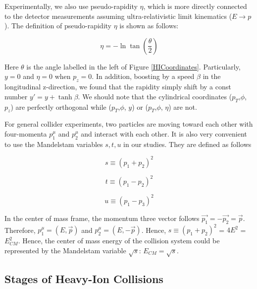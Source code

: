 Experimentally, we also use pseudo-rapidity $\eta$, which is more directly connected to the detector measurements assuming ultra-relativistic limit kinematics ($E \rightarrow p$). The definition of pseudo-rapidity $\eta$ is shown as follows:

\begin{equation}
\eta =  - \ln \tan(\frac{\theta}{2})
\end{equation}

Here $\theta$ is the angle labelled in the left of Figure \ref{HICoordinates}. Particularly, $y = 0$ and $\eta = 0$ when $p_z = 0$. In addition, boosting by a speed $\beta$ in the longitudinal z-direction, we found that the rapidity simply shift by a const number $y' = y + \tanh \beta$. We should note that the cylindrical coordinates ($p_T$,$\phi$, $p_z$) are perfectly orthogonal while ($p_T$,$\phi$, $y$) or ($p_T$,$\phi$, $\eta$) are not.

For general collider experiments, two particles are moving toward each other with four-momenta $p_1^\mu$ and $p_2^\mu$ and interact with each other. It is also very convenient to use the Mandelstam variables $s, t, u$ in our studies. They are defined as follows

\begin{equation}
s \equiv (p_1 + p_2)^2
\end{equation}

\begin{equation}
t \equiv (p_1 - p_2)^2
\end{equation}

\begin{equation}
u \equiv (p_1 - p_3)^2
\end{equation}


In the center of mass frame, the momentum three vector follows $\vec{p_1} = -\vec{p_2} = \vec{p}$. Therefore, $p_1^\mu = (E, \vec{p})$ and $p_2^\mu = (E, -\vec{p})$. Hence, $s \equiv (p_1 + p_2)^2$ = $4E^2$ = $E_{CM}^2$. Hence, the center of mass energy of the collision system could be represented by the Mandelstam variable $\sqrt{s}$: $E_{CM} = \sqrt{s}$.



\subsection{Stages of Heavy-Ion Collisions}

